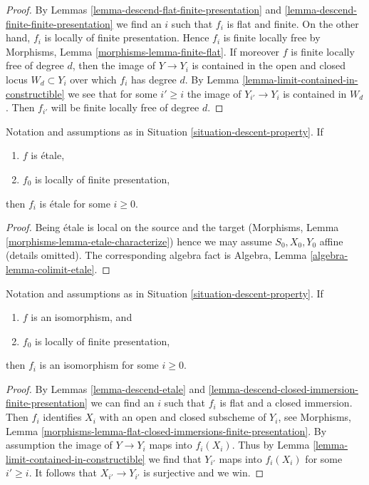 \begin{proof}
By
Lemmas \ref{lemma-descend-flat-finite-presentation} and
\ref{lemma-descend-finite-finite-presentation}
we find an $i$ such that $f_i$ is flat and finite.
On the other hand, $f_i$ is locally of finite presentation.
Hence $f_i$ is finite locally free by
Morphisms, Lemma \ref{morphisms-lemma-finite-flat}.
If moreover $f$ is finite locally free of degree $d$,
then the image of $Y \to Y_i$ is contained in the
open and closed locus $W_d \subset Y_i$ over which $f_i$ has degree
$d$. By
Lemma \ref{lemma-limit-contained-in-constructible}
we see that for some $i' \geq i$ the image of $Y_{i'} \to Y_i$
is contained in $W_d$.
Then $f_{i'}$ will be finite locally free of degree $d$.
\end{proof}

\begin{lemma}
\label{lemma-descend-etale}
Notation and assumptions as in Situation \ref{situation-descent-property}.
If
\begin{enumerate}
\item $f$ is \'etale,
\item $f_0$ is locally of finite presentation,
\end{enumerate}
then $f_i$ is \'etale for some $i \geq 0$.
\end{lemma}

\begin{proof}
Being \'etale is local on the source and the target (Morphisms,
Lemma \ref{morphisms-lemma-etale-characterize}) hence we may assume
$S_0, X_0, Y_0$ affine (details omitted). The corresponding algebra fact is
Algebra, Lemma \ref{algebra-lemma-colimit-etale}.
\end{proof}

\begin{lemma}
\label{lemma-descend-isomorphism}
Notation and assumptions as in Situation \ref{situation-descent-property}.
If
\begin{enumerate}
\item $f$ is an isomorphism, and
\item $f_0$ is locally of finite presentation,
\end{enumerate}
then $f_i$ is an isomorphism for some $i \geq 0$.
\end{lemma}

\begin{proof}
By Lemmas \ref{lemma-descend-etale} and
\ref{lemma-descend-closed-immersion-finite-presentation}
we can find an $i$ such that $f_i$ is flat and a closed immersion.
Then $f_i$ identifies $X_i$ with an open and closed subscheme of
$Y_i$, see Morphisms, Lemma
\ref{morphisms-lemma-flat-closed-immersions-finite-presentation}.
By assumption the image of $Y \to Y_i$ maps into $f_i(X_i)$.
Thus by Lemma \ref{lemma-limit-contained-in-constructible}
we find that $Y_{i'}$ maps into $f_i(X_i)$ for some $i' \geq i$.
It follows that $X_{i'} \to Y_{i'}$ is surjective and we win.
\end{proof}

